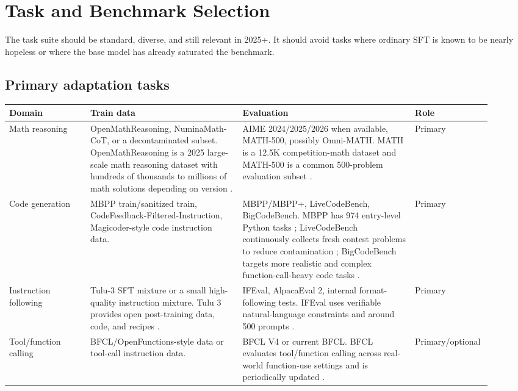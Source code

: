 \documentclass[11pt]{article}
\begin{document}
\section{Task and Benchmark Selection}

The task suite should be standard, diverse, and still relevant in 2025+. It should avoid tasks where ordinary SFT is known to be nearly hopeless or where the base model has already saturated the benchmark.

\subsection{Primary adaptation tasks}

\begin{longtable}{>{\raggedright\arraybackslash}p{0.16\linewidth} >{\raggedright\arraybackslash}p{0.30\linewidth} >{\raggedright\arraybackslash}p{0.34\linewidth} >{\raggedright\arraybackslash}p{0.12\linewidth}}
\toprule
Domain & Train data & Evaluation & Role \\
\midrule
Math reasoning & OpenMathReasoning, NuminaMath-CoT, or a decontaminated subset. OpenMathReasoning is a 2025 large-scale math reasoning dataset with hundreds of thousands to millions of math solutions depending on version \cite{moshkov2025openmathreasoning}. & AIME 2024/2025/2026 when available, MATH-500, possibly Omni-MATH. MATH is a 12.5K competition-math dataset and MATH-500 is a common 500-problem evaluation subset \cite{hendrycks2021math}. & Primary \\
\addlinespace
Code generation & MBPP train/sanitized train, CodeFeedback-Filtered-Instruction, Magicoder-style code instruction data. & MBPP/MBPP+, LiveCodeBench, BigCodeBench. MBPP has 974 entry-level Python tasks \cite{austin2021mbpp}; LiveCodeBench continuously collects fresh contest problems to reduce contamination \cite{jain2024livecodebench}; BigCodeBench targets more realistic and complex function-call-heavy code tasks \cite{zhuo2024bigcodebench}. & Primary \\
\addlinespace
Instruction following & Tulu-3 SFT mixture or a small high-quality instruction mixture. Tulu 3 provides open post-training data, code, and recipes \cite{lambert2024tulu3}. & IFEval, AlpacaEval 2, internal format-following tests. IFEval uses verifiable natural-language constraints and around 500 prompts \cite{zhou2023ifeval}. & Primary \\
\addlinespace
Tool/function calling & BFCL/OpenFunctions-style data or tool-call instruction data. & BFCL V4 or current BFCL. BFCL evaluates tool/function calling across real-world function-use settings and is periodically updated \cite{patil2025bfcl}. & Primary/optional \\
\bottomrule
\end{longtable}
\end{document}
